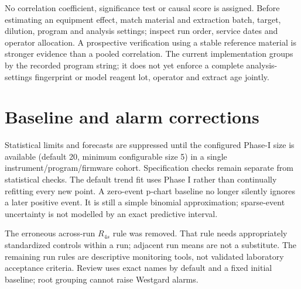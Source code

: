 





No correlation coefficient, significance test or causal score is assigned. Before estimating an equipment effect, match
material and extraction batch, target, dilution, program and analysis settings; inspect run order, service dates and operator
allocation. A prospective verification using a stable reference material is stronger evidence than a pooled correlation.
The current implementation groups by the recorded program string; it does not yet enforce a complete analysis-settings
fingerprint or model reagent lot, operator and extract age jointly.

\section{Baseline and alarm corrections}
Statistical limits and forecasts are suppressed until the configured Phase-I size is available (default 20, minimum configurable
size 5) in a single instrument/program/firmware cohort. Specification checks remain separate from statistical checks.
The default trend fit uses Phase I rather than continually refitting every new point. A zero-event p-chart baseline no longer
silently ignores a later positive event. It is still a simple binomial approximation; sparse-event uncertainty is not modelled
by an exact predictive interval.

The erroneous across-run $R_{4s}$ rule was removed. That rule needs appropriately standardized controls within a run;
adjacent run means are not a substitute. The remaining run rules are descriptive monitoring tools, not validated laboratory
acceptance criteria. Review uses exact names by default and a fixed initial baseline; root grouping cannot raise Westgard alarms.

